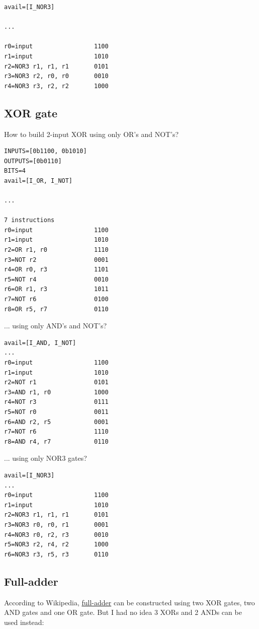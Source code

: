 \begin{lstlisting}
avail=[I_NOR3]

...

r0=input                 1100
r1=input                 1010
r2=NOR3 r1, r1, r1       0101
r3=NOR3 r2, r0, r0       0010
r4=NOR3 r3, r2, r2       1000
\end{lstlisting}

\subsection{XOR gate}

How to build 2-input XOR using only OR's and NOT's?

\begin{lstlisting}
INPUTS=[0b1100, 0b1010]
OUTPUTS=[0b0110]
BITS=4
avail=[I_OR, I_NOT]

...

7 instructions
r0=input                 1100
r1=input                 1010
r2=OR r1, r0             1110
r3=NOT r2                0001
r4=OR r0, r3             1101
r5=NOT r4                0010
r6=OR r1, r3             1011
r7=NOT r6                0100
r8=OR r5, r7             0110
\end{lstlisting}

... using only AND's and NOT's?

\begin{lstlisting}
avail=[I_AND, I_NOT]
...
r0=input                 1100
r1=input                 1010
r2=NOT r1                0101
r3=AND r1, r0            1000
r4=NOT r3                0111
r5=NOT r0                0011
r6=AND r2, r5            0001
r7=NOT r6                1110
r8=AND r4, r7            0110
\end{lstlisting}

... using only NOR3 gates?

\begin{lstlisting}
avail=[I_NOR3]
...
r0=input                 1100
r1=input                 1010
r2=NOR3 r1, r1, r1       0101
r3=NOR3 r0, r0, r1       0001
r4=NOR3 r0, r2, r3       0010
r5=NOR3 r2, r4, r2       1000
r6=NOR3 r3, r5, r3       0110
\end{lstlisting}

\subsection{Full-adder}

According to Wikipedia, \href{https://en.wikipedia.org/wiki/Adder_(electronics)}{full-adder}
can be constructed using two XOR gates, two AND gates and one OR gate.
But I had no idea 3 XORs and 2 ANDs can be used instead:

